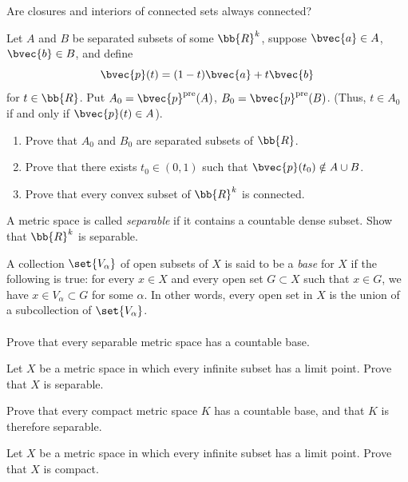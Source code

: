 \documentclass[12pt,letterpaper]{hmcpset}
\begin{document}
\begin{problem}[20.]
	Are closures and interiors of connected sets always connected?
\end{problem}

\begin{problem}[21.]
	Let $A$ and $B$ be separated subsets of some $\bb{R}^k$, suppose $\bvec{a} \in A$, $\bvec{b} \in B$, and define
	\[
		\bvec{p}(t) = (1 - t) \bvec{a} + t \bvec{b}
	\]
	for $t \in \bb{R}$. Put $A_0 = \bvec{p}^{\text{pre}}(A)$, $B_0 = \bvec{p}^{\text{pre}}(B)$. (Thus, $t \in A_0$ if and only if $\bvec{p}(t) \in A$).
	\begin{enumerate}
		\item Prove that $A_0$ and $B_0$ are separated subsets of $\bb{R}$.
		\item Prove that there exists $t_0 \in (0, 1)$ such that $\bvec{p}(t_0) \notin A \cup B$.
		\item Prove that every convex subset of $\bb{R}^k$ is connected.
	\end{enumerate}
\end{problem}

\begin{problem}[22.]
	A metric space is called \textit{separable} if it contains a countable dense subset. Show that $\bb{R}^k$ is separable.
\end{problem}

\begin{problem}[23.]
	A collection $\set{V_\alpha}$ of open subsets of $X$ is said to be a \textit{base} for $X$ if the following is true: for every $x \in X$ and every open set $G \subset X$ such that $x \in G$, we have $x \in V_\alpha \subset G$ for some $\alpha$. In other words, every open set in $X$ is the union of a subcollection of $\set{V_\alpha}$. \\\\
	Prove that every separable metric space has a countable base.
\end{problem}

\begin{problem}[24.]
	Let $X$ be a metric space in which every infinite subset has a limit point. Prove that $X$ is separable.
\end{problem}

\begin{problem}[25.]
	Prove that every compact metric space $K$ has a countable base, and that $K$ is therefore separable.
\end{problem}

\begin{problem}[26.]
	Let $X$ be a metric space in which every infinite subset has a limit point. Prove that $X$ is compact.
\end{problem}
\end{document}
